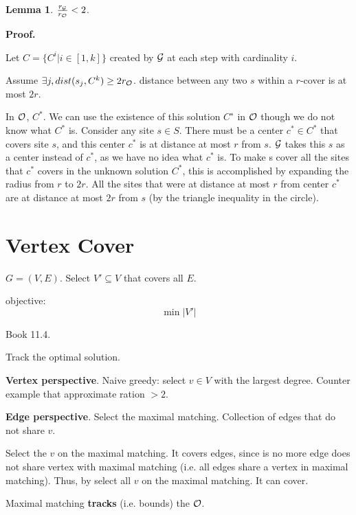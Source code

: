 \documentclass[a4paper]{report}
\theoremstyle{definition}
\newtheorem{lem}{Lemma}[section]
\begin{document}
\begin{lem}
$\frac{r_{\mathcal{G}}}{r_{\mathcal{O}}}<2$.
\end{lem}

\textbf{Proof.}

Let $C=\{C^i | i\in[1, k]\}$ created by $\mathcal{G}$ at each step with cardinality $i$.

Assume $\exists j, dist(s_j, C^k)\geq 2r_{\mathcal{O}}$. distance between any two $s$ within a $r$-cover is at most $2r$.

In $\mathcal{O}$, $C^*$. We can use the existence of this solution $C^∗$ in $\mathcal{O}$ though we do not know what $C^*$ is. Consider any site $s \in S$. There must be a center $c^* \in C^*$ that covers site $s$, and this center $c^*$ is at distance at most $r$ from $s$. $\mathcal{G}$ takes this $s$ as a center instead of $c^*$, as we have no idea what $c^*$ is. To make s cover all the sites that $c^*$ covers in the unknown solution $C^*$, this is accomplished by expanding the radius from $r$ to $2r$. All the sites that were at distance at most $r$ from center $c^*$ are at distance at most $2r$ from $s$ (by the triangle inequality in the circle).

\section{Vertex Cover}
$G=(V, E)$. Select $V'\subseteq V$ that covers all $E$.

objective:
$$\min |V'|$$

Book 11.4.

Track the optimal solution.

\textbf{Vertex perspective}. Naive greedy: select $v\in V$ with the largest degree. Counter example that approximate ration $>2$.

\textbf{Edge perspective}. Select the maximal matching. Collection of edges that do not share $v$.

Select the $v$ on the maximal matching. It covers edges, since is no more edge does not share vertex with maximal matching (i.e. all edges share a vertex in maximal matching). Thus, by select all $v$ on the maximal matching. It can cover.

Maximal matching \textbf{tracks} (i.e. bounds) the $\mathcal{O}$.
\end{document}
